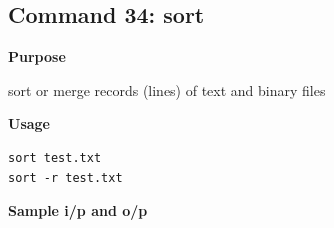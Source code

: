 \subsection{Command 34: sort} 
\textbf{Purpose}
\begin{flushleft}
 sort or merge records (lines) of text and binary files
\end{flushleft}
\textbf{Usage}
\begin{verbatim}
sort test.txt
sort -r test.txt
\end{verbatim}
\textbf{Sample i/p and o/p}
\begin{figure}[H] 
\end{figure}

